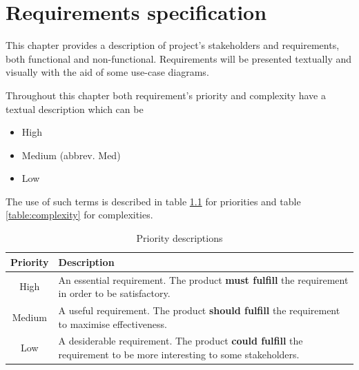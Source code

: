 
\chapter{Requirements specification}

\label{ch:requirements}

This chapter provides a description of project's stakeholders and requirements, both
functional and non-functional. Requirements will be presented textually and visually
with the aid of some use-case diagrams.

Throughout this chapter both requirement's priority and complexity have a textual description which can be
\begin{itemize}
\item High
\item Medium (abbrev. Med)
\item Low
\end{itemize}

The use of such terms is described in table \ref{table:priorities} for priorities
and table \ref{table:complexity} for complexities.
\begin{table}[H]
\begin{center}
\begin{tabular}{ | c | p{12.5cm} | }
  \hline
  Priority & Description \\
  \hline\noalign{\smallskip}\noalign{\smallskip}\hline
  High & An essential requirement.\newline
  The product \textbf{must fulfill} the requirement in order to be satisfactory. \\
  Medium & A useful requirement.\newline
  The product \textbf{should fulfill} the requirement to maximise effectiveness. \\
  Low & A desiderable requirement.\newline
  The product \textbf{could fulfill} the requirement to be more interesting to some stakeholders. \\
  \hline
\end{tabular}
\end{center}
\caption{Priority descriptions}
\label{table:priorities}
\end{table}

